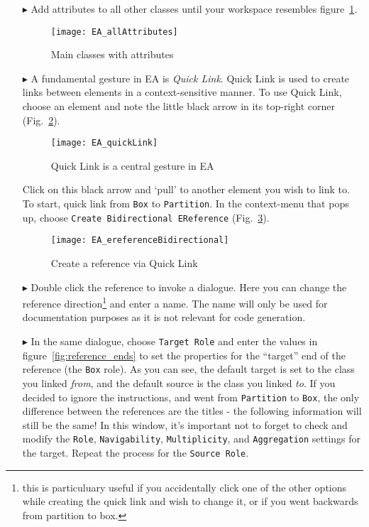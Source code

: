 \begin{itemize}
\pagebreak

\item[$\blacktriangleright$] Add attributes to all other classes until your workspace resembles figure~\ref{fig:attribute_completed}.

\begin{figure}[htbp]
	\centering
  \texttt{[image: EA\_allAttributes]}
	\caption{Main classes with attributes}
	\label{fig:attribute_completed}
\end{figure}
\FloatBarrier


\item[$\blacktriangleright$] A fundamental gesture in EA is \emph{Quick Link}. Quick Link is used to create links between elements in a context-sensitive
manner. To use Quick Link, choose an element and note the little black arrow in its top-right corner (Fig.~\ref{fig:quicklink}).

\begin{figure}[htbp]
	\centering
  \texttt{[image: EA\_quickLink]}
	\caption{Quick Link is a central gesture in EA}
	\label{fig:quicklink}
\end{figure}
\FloatBarrier

\pagebreak

Click on this black arrow and `pull' to another element you wish to link to. To start, quick link from \texttt{Box} to \texttt{Partition}. In the context-menu
that pops up, choose \texttt{Create Bidirectional EReference} (Fig.~\ref{fig:ereference}).

\begin{figure}[htbp]
	\centering
  \texttt{[image: EA\_ereferenceBidirectional]}
	\caption{Create a reference via Quick Link}
	\label{fig:ereference}
\end{figure}
\FloatBarrier

\item[$\blacktriangleright$] Double click the reference to invoke a dialogue. Here you can change the reference direction\footnote{this is particuluary useful
if you accidentally click one of the other options while creating the quick link and wish to change it, or if you went backwards from partition to box.} and
enter a name. The name will only be used for documentation purposes as it is not relevant for code generation.

\item[$\blacktriangleright$] In the same dialogue, choose \texttt{Target Role} and enter the values in figure~\ref{fig:reference_ends} to set the properties for
the ``target'' end of the reference (the \texttt{Box} role). As you can see, the default target is set to the class you linked \emph{from}, and the default
source is the class you linked \emph{to}. If you decided to ignore the instructions, and went from \texttt{Partition} to \texttt{Box}, the only difference
between the references are the titles - the following information will still be the same! In this window, it's important not to forget to check and modify the
\texttt{Role}, \texttt{Navigability}, \texttt{Multiplicity}, and \texttt{Aggregation} settings for the target.  Repeat the process for the \texttt{Source Role}.


\end{itemize}
